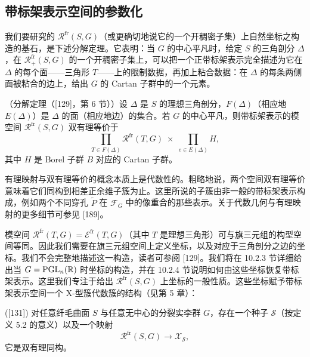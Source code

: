 \subsection{带标架表示空间的参数化}

我们要研究的 $\mathcal{R}^{\mathrm{fr}}(S,G)$（或更确切地说它的一个开稠密子集）上自然坐标之构造的基石，是下述分解定理。它表明：当 $G$ 的中心平凡时，给定 $S$ 的三角剖分 $\Delta$，在 $\mathcal{R}^{\mathrm{fr}}_+(S,G)$ 的一个开稠密子集上，可以把一个正带标架表示完全描述为它在 $\Delta$ 的每个面——三角形 $T$——上的限制数据，再加上粘合数据：在 $\Delta$ 的每条两侧面被粘合的边上，给出 $G$ 的 Cartan 子群中的一个元素。

\begin{theorem}[10.17]（分解定理（[129]，第 6 节））设 $\Delta$ 是 $S$ 的理想三角剖分，$F(\Delta)$（相应地 $E(\Delta)$）是 $\Delta$ 的面（相应地边）的集合。若 $G$ 的中心平凡，则带标架表示的模空间 $\mathcal{R}^{\mathrm{fr}}(S,G)$ 双有理等价于
\begin{equation}
\prod_{T\in F(\Delta)}\mathcal{R}^{\mathrm{fr}}(T,G)\;\times\;\prod_{e\in E(\Delta)}H, \tag{10.1}
\end{equation}
其中 $H$ 是 Borel 子群 $B$ 对应的 Cartan 子群。
\end{theorem}

\begin{remark}[10.18] 有理映射与双有理等价的概念本质上是代数性的。粗略地说，两个空间双有理等价意味着它们同构到相差正余维子簇为止。这里所说的子簇由非一般的带标架表示构成，例如两个不同穿孔 $\tilde P$ 在 $\mathcal{F}_G$ 中的像重合的那些表示。关于代数几何与有理映射的更多细节可参见 [189]。
\end{remark}

模空间 $\mathcal{R}^{\mathrm{fr}}(T,G)=\mathcal{E}^{\mathrm{fr}}(T,G)$（其中 $T$ 是理想三角形）可与旗三元组的构型空间等同。因此我们需要在旗三元组空间上定义坐标，以及对应于三角剖分之边的坐标。我们不会完整地描述这一构造，读者可参阅 [129]。我们将在 10.2.3 节详细给出当 $G=\operatorname{PGL}_n(\mathbb{R})$ 时坐标的构造，并在 10.2.4 节说明如何由这些坐标恢复带标架表示。这里我们专注于给出 $\mathcal{R}^{\mathrm{fr}}(S,G)$ 上坐标的一般性质。这些坐标赋予带标架表示空间一个 X-型簇代数簇的结构（见第 5 章）：

\begin{theorem}[10.19] ([131]) 对任意纤毛曲面 $S$ 与任意无中心的分裂实李群 $G$，存在一个种子 $\mathcal{S}$（按定义 5.2 的意义）以及一个映射
\begin{equation}
\mathcal{R}^{\mathrm{fr}}(S,G)\to\mathcal{X}_{\mathcal{S}}, \tag{10.2}
\end{equation}
它是双有理同构。
\end{theorem}

